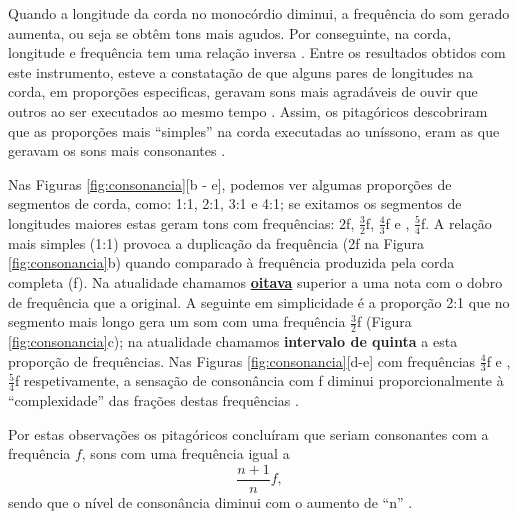 Quando a longitude da corda no monocórdio diminui, 
a frequência do som gerado aumenta, ou seja se obtêm tons mais agudos.
Por conseguinte, na corda, longitude e frequência tem uma relação inversa \cite[pp. 12]{arbones2012armonia}. 
Entre os resultados obtidos com este instrumento, 
esteve a constatação de que alguns pares de longitudes na corda, em proporções especificas, 
geravam sons mais agradáveis de ouvir que outros 
ao ser executados ao mesmo tempo \cite[pp. 12]{arbones2012armonia}.
Assim, os pitagóricos descobriram que as proporções mais ``simples'' na corda executadas ao uníssono,
eram as que geravam os sons mais consonantes \cite[pp. 12]{arbones2012armonia}.

Nas Figuras \ref{fig:consonancia}[b - e], podemos ver algumas proporções de segmentos de corda,
como: 1:1, 2:1, 3:1 e 4:1; se exitamos os segmentos de longitudes maiores estas geram tons com frequências: 
$2$f, $\frac{3}{2}$f, $\frac{4}{3}$f e , $\frac{5}{4}$f.
A relação mais simples (1:1) provoca a duplicação da frequência (2f na Figura \ref{fig:consonancia}b)
quando comparado à frequência produzida pela corda completa (f). 
Na atualidade 
chamamos \hyperref[sec:pos:Oitava]{\textbf{oitava}} superior a uma nota com o dobro de frequência que a original. 
A seguinte em simplicidade é a proporção 2:1 que no segmento mais longo gera um som com uma frequência $\frac{3}{2}$f (Figura \ref{fig:consonancia}c);
na atualidade chamamos \textbf{intervalo de quinta} a esta proporção de frequências.
Nas Figuras \ref{fig:consonancia}[d-e] com frequências $\frac{4}{3}$f e , $\frac{5}{4}$f respetivamente,
a sensação de consonância com f diminui proporcionalmente à ``complexidade'' das frações destas frequências \cite[pp. 12]{arbones2012armonia}.

Por estas observações os pitagóricos concluíram que seriam consonantes com a frequência $f$, sons com uma frequência igual a 
\begin{equation}
\label{eq:simplespita}
\frac{n+1}{n}f,
\end{equation}
sendo que o nível de consonância diminui com o aumento de ``n'' \cite[pp. 14]{arbones2012armonia}.

\label{ref:paginadiatonicanumerica}

